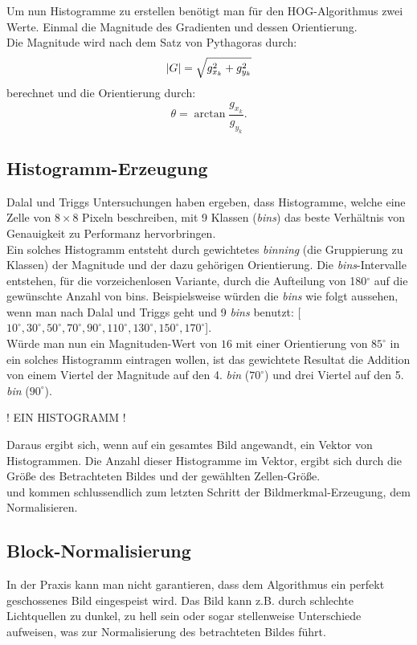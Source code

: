 Um nun Histogramme zu erstellen benötigt man für den HOG-Algorithmus zwei Werte. Einmal die Magnitude des Gradienten und dessen Orientierung.\\
Die Magnitude wird nach dem Satz von Pythagoras durch:
$$\lvert G \rvert = \sqrt{\strut{g_{x_k}^{2}+g_{y_k}^{2}}}$$
berechnet und die Orientierung durch:
$$ \theta=\arctan\frac{g_{x_k}}{g_{y_k}}. $$

\subsection{Histogramm-Erzeugung}

Dalal und Triggs Untersuchungen haben ergeben, dass Histogramme, welche eine Zelle von $8\times8$ Pixeln beschreiben, mit 9 Klassen (\emph{bins}) das beste Verhältnis von Genauigkeit zu Performanz hervorbringen.\\
Ein solches Histogramm entsteht durch gewichtetes \emph{binning} (die Gruppierung zu Klassen) der Magnitude und der dazu gehörigen Orientierung.
Die \emph{bins}-Intervalle entstehen, für die vorzeichenlosen Variante, durch die Aufteilung von 180$^\circ$ auf die gewünschte Anzahl von bins.
Beispielsweise würden die \emph{bins} wie folgt aussehen, wenn man nach Dalal und Triggs geht und 9 \emph{bins} benutzt: 
[$10^\circ,30^\circ,50^\circ,70^\circ,90^\circ,110^\circ,130^\circ,150^\circ,170^\circ$].\\
Würde man nun ein Magnituden-Wert von $16$ mit einer Orientierung von $85^\circ$ in ein solches Histogramm eintragen wollen, ist das gewichtete Resultat die Addition von einem Viertel der Magnitude auf den 4. \emph{bin} ($70^\circ$) und drei Viertel auf den 5. \emph{bin} ($90^\circ$).

\vspace*{5 mm}
! EIN HISTOGRAMM !
\vspace*{5 mm}

Daraus ergibt sich, wenn auf ein gesamtes Bild angewandt, ein Vektor von Histogrammen. Die Anzahl dieser Histogramme im Vektor, ergibt sich durch die Größe des Betrachteten Bildes und der gewählten Zellen-Größe.\\
und kommen schlussendlich zum letzten Schritt der Bildmerkmal-Erzeugung, dem Normalisieren.

\subsection{Block-Normalisierung}

In der Praxis kann man nicht garantieren, dass dem Algorithmus ein perfekt geschossenes Bild eingespeist wird. Das Bild kann z.B. durch schlechte Lichtquellen zu dunkel, zu hell sein oder sogar stellenweise Unterschiede aufweisen, was zur Normalisierung des betrachteten Bildes führt.


